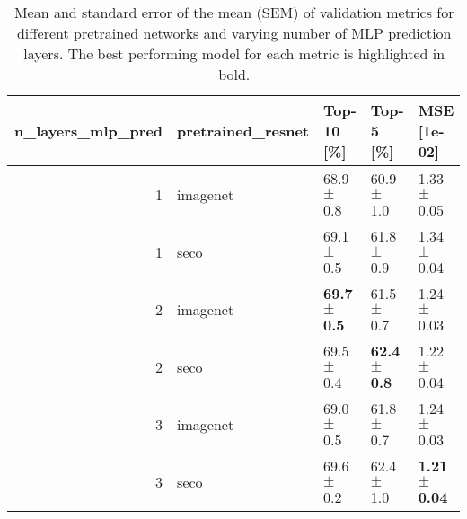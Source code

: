 \begin{table}[h]
\caption{Mean and standard error of the mean (SEM) of validation metrics for different pretrained networks and varying number of MLP prediction layers.  The best performing model for each metric is highlighted in bold.}
\label{tab:mlp-layer_pretrained}
\begin{tabular}{rllll}
\toprule
n_layers_mlp_pred & pretrained_resnet & Top-10 [\%] & Top-5 [\%] & MSE [1e-02] \\
\midrule
1 & imagenet & 68.9 $\pm$ 0.8 & 60.9 $\pm$ 1.0 & 1.33 $\pm$ 0.05 \\
1 & seco & 69.1 $\pm$ 0.5 & 61.8 $\pm$ 0.9 & 1.34 $\pm$ 0.04 \\
2 & imagenet & \textbf{69.7 $\pm$ 0.5} & 61.5 $\pm$ 0.7 & 1.24 $\pm$ 0.03 \\
2 & seco & 69.5 $\pm$ 0.4 & \textbf{62.4 $\pm$ 0.8} & 1.22 $\pm$ 0.04 \\
3 & imagenet & 69.0 $\pm$ 0.5 & 61.8 $\pm$ 0.7 & 1.24 $\pm$ 0.03 \\
3 & seco & 69.6 $\pm$ 0.2 & 62.4 $\pm$ 1.0 & \textbf{1.21 $\pm$ 0.04} \\
\bottomrule
\end{tabular}
\end{table}
